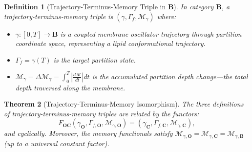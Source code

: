 \documentclass[twocolumn,10pt]{article}
\newtheorem{theorem}{Theorem}[section]
\newtheorem{definition}[theorem]{Definition}
\theoremstyle{remark}
\newcommand{\Depth}{\mathcal{M}}
\newcommand{\CatO}{\mathbf{O}}
\newcommand{\CatC}{\mathbf{C}}
\newcommand{\CatB}{\mathbf{B}}
\newcommand{\Foc}{F_{\CatO\CatC}}
\begin{document}
\begin{definition}[Trajectory-Terminus-Memory Triple in $\CatB$]
\label{def:ttm_B}
In category $\CatB$, a \emph{trajectory-terminus-memory triple} is $(\gamma, \Gamma_f, \mathcal{M}_\gamma)$ where:
\begin{itemize}
    \item $\gamma: [0,T] \to \CatB$ is a coupled membrane oscillator trajectory through partition coordinate space, representing a lipid conformational trajectory.
    \item $\Gamma_f = \gamma(T)$ is the target partition state.
    \item $\mathcal{M}_\gamma = \Delta\Depth_\gamma = \int_0^T \left|\frac{d\Depth}{dt}\right|dt$ is the accumulated partition depth change---the total depth traversed along the membrane.
\end{itemize}
\end{definition}

\begin{theorem}[Trajectory-Terminus-Memory Isomorphism]
\label{thm:ttm_iso}
The three definitions of trajectory-terminus-memory triples are related by the functors:
\begin{equation}
\Foc(\gamma_\CatO, \Gamma_{f,\CatO}, \mathcal{M}_{\gamma,\CatO}) = (\gamma_\CatC, \Gamma_{f,\CatC}, \mathcal{M}_{\gamma,\CatC}),
\end{equation}
and cyclically.
Moreover, the memory functionals satisfy $\mathcal{M}_{\gamma,\CatO} = \mathcal{M}_{\gamma,\CatC} = \mathcal{M}_{\gamma,\CatB}$ (up to a universal constant factor).
\end{theorem}
\end{document}
